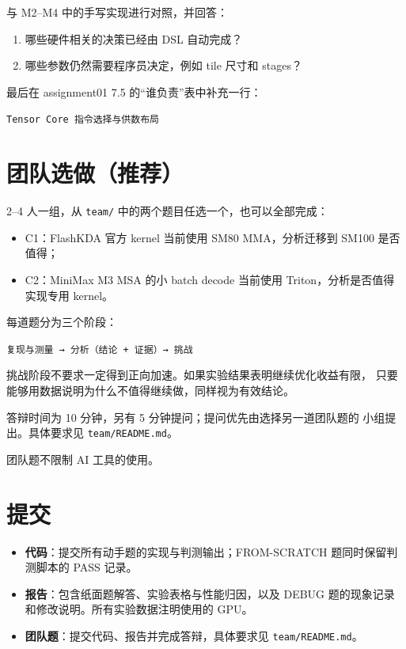 \documentclass[11pt,a4paper,fontset=none]{ctexart}
\providecommand{\tightlist}{\setlength{\itemsep}{0pt}\setlength{\parskip}{0pt}}
\providecommand{\passthrough}[1]{#1}
\begin{document}
与 M2--M4 中的手写实现进行对照，并回答：

\begin{enumerate}
\def\labelenumi{(\alph{enumi})}
\item
  哪些硬件相关的决策已经由 DSL 自动完成？
\item
  哪些参数仍然需要程序员决定，例如 tile 尺寸和 stages？
\end{enumerate}

最后在 assignment01 7.5 的``谁负责''表中补充一行：

\passthrough{\lstinline!Tensor Core 指令选择与供数布局!}

\section*{团队选做（推荐）}\label{ux56e2ux961fux9009ux505aux63a8ux8350}

2--4 人一组，从 \passthrough{\lstinline!team/!}
中的两个题目任选一个，也可以全部完成：

\begin{itemize}
\tightlist
\item
  C1：FlashKDA 官方 kernel 当前使用 SM80 MMA，分析迁移到 SM100
  是否值得；
\item
  C2：MiniMax M3 MSA 的小 batch decode 当前使用
  Triton，分析是否值得实现专用 kernel。
\end{itemize}

每道题分为三个阶段：

\passthrough{\lstinline!复现与测量 → 分析（结论 + 证据）→ 挑战!}

挑战阶段不要求一定得到正向加速。如果实验结果表明继续优化收益有限，
只要能够用数据说明为什么不值得继续做，同样视为有效结论。

答辩时间为 10 分钟，另有 5 分钟提问；提问优先由选择另一道团队题的
小组提出。具体要求见 \passthrough{\lstinline!team/README.md!}。

团队题不限制 AI 工具的使用。

\section*{提交}\label{ux63d0ux4ea4}

\begin{itemize}
\tightlist
\item
  \textbf{代码}：提交所有动手题的实现与判测输出；FROM-SCRATCH
  题同时保留判测脚本的 PASS 记录。
\item
  \textbf{报告}：包含纸面题解答、实验表格与性能归因，以及 DEBUG
  题的现象记录和修改说明。所有实验数据注明使用的 GPU。
\item
  \textbf{团队题}：提交代码、报告并完成答辩，具体要求见
  \passthrough{\lstinline!team/README.md!}。
\end{itemize}
\end{document}
